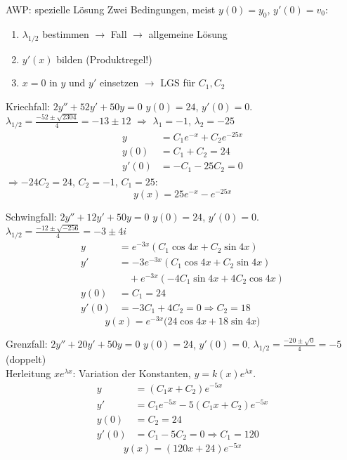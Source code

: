 \documentclass[a4paper, fontsize=7pt]{scrartcl}
\begin{document}
\begin{mainbox}{AWP: spezielle Lösung}
Zwei Bedingungen, meist $y(0) = y_0$, $y'(0) = v_0$:
\begin{enumerate}
    \item $\lambda_{1/2}$ bestimmen $\to$ Fall $\to$ allgemeine Lösung
    \item $y'(x)$ bilden (Produktregel!)
    \item $x = 0$ in $y$ und $y'$ einsetzen $\to$ LGS für $C_1, C_2$
\end{enumerate}
\end{mainbox}

\begin{subbox}{Kriechfall: $2y'' + 52y' + 50y = 0$}
$y(0) = 24$, $y'(0) = 0$.
$\lambda_{1/2} = \frac{-52 \pm \sqrt{2304}}{4} = -13 \pm 12$
$\Rightarrow$ $\lambda_1 = -1$, $\lambda_2 = -25$
\begin{align*}
y &= C_1e^{-x} + C_2e^{-25x}\\
y(0) &= C_1 + C_2 = 24\\
y'(0) &= -C_1 - 25C_2 = 0
\end{align*}
$\Rightarrow -24C_2 = 24$, $C_2 = -1$, $C_1 = 25$:
$$y(x) = 25e^{-x} - e^{-25x}$$
\end{subbox}

\begin{subbox}{Schwingfall: $2y'' + 12y' + 50y = 0$}
$y(0) = 24$, $y'(0) = 0$.
$\lambda_{1/2} = \frac{-12 \pm \sqrt{-256}}{4} = -3 \pm 4i$
\begin{align*}
y &= e^{-3x}(C_1\cos 4x + C_2\sin 4x)\\
y' &= -3e^{-3x}(C_1\cos 4x + C_2\sin 4x)\\
&\quad + e^{-3x}(-4C_1\sin 4x + 4C_2\cos 4x)\\
y(0) &= C_1 = 24\\
y'(0) &= -3C_1 + 4C_2 = 0 \Rightarrow C_2 = 18
\end{align*}
$$y(x) = e^{-3x}\big(24\cos 4x + 18\sin 4x\big)$$
\end{subbox}

\begin{subbox}{Grenzfall: $2y'' + 20y' + 50y = 0$}
$y(0) = 24$, $y'(0) = 0$.
$\lambda_{1/2} = \frac{-20 \pm \sqrt{0}}{4} = -5$ (doppelt)\\
Herleitung $xe^{\lambda x}$: Variation der Konstanten, $y = k(x)e^{\lambda
x}$.
\begin{align*}
y &= (C_1x + C_2)e^{-5x}\\
y' &= C_1e^{-5x} - 5(C_1x + C_2)e^{-5x}\\
y(0) &= C_2 = 24\\
y'(0) &= C_1 - 5C_2 = 0 \Rightarrow C_1 = 120
\end{align*}
$$y(x) = (120x + 24)e^{-5x}$$
\end{subbox}
\end{document}
